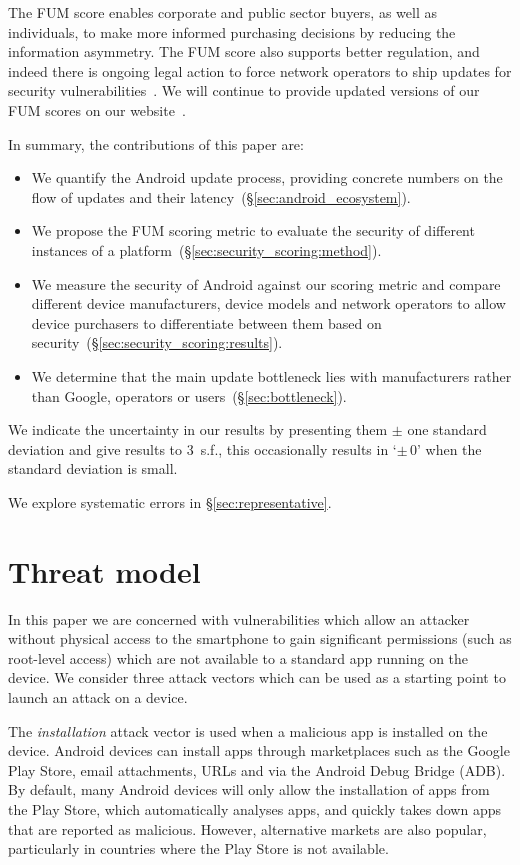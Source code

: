 \documentclass{sig-alternate-2013}
\let\OldTodo\todo
\renewcommand{\todo}{\OldTodo[inline]}
\newcommand{\todolater}[1]{}%
\begin{document}
The FUM score enables corporate and public sector buyers, as well as individuals, to make more informed purchasing decisions by reducing the information asymmetry.
The FUM score also supports better regulation, and indeed there is ongoing legal action to force network operators to ship updates for security vulnerabilities~\cite{Soghoian2013}.\todolater{Check on the status of this legal action}
We will continue to provide updated versions of our FUM scores on our website~\cite{androidvulnerabilities.org}.

In summary, the contributions of this paper are:
\begin{itemize}
 \item We quantify the Android update process, providing concrete numbers on the flow of updates and their latency~(\S\ref{sec:android_ecosystem}).
 \item We propose the FUM scoring metric to evaluate the security of different instances of a platform~(\S\ref{sec:security_scoring:method}).
 \item We measure the security of Android against our scoring metric and compare different device manufacturers, device models and network operators to allow device purchasers to differentiate between them based on security~(\S\ref{sec:security_scoring:results}).
 \item We determine that the main update bottleneck lies with manufacturers rather than Google, operators or users~(\S\ref{sec:bottleneck}).
\end{itemize}

We indicate the uncertainty in our results by presenting them $\pm$ one standard deviation and give results to 3~s.f., this occasionally results in `$\pm\, 0$' when the standard deviation is small.
\todolater{Do we want to use the 95 percentile instead}
We explore systematic errors in \S\ref{sec:representative}.

\section{Threat model}
\label{sec:threatmodel}

In this paper we are concerned with vulnerabilities which allow an attacker without physical access to the smartphone to gain significant permissions (such as root-level access) which are not available to a standard app running on the device. We consider three attack vectors which can be used as a starting point to launch an attack on a device.

The \emph{installation} attack vector is used when a malicious app is installed on the device.
Android devices can install apps through marketplaces such as the Google Play Store, email attachments, URLs and via the Android Debug Bridge (ADB).
By default, many Android devices will only allow the installation of apps from the Play Store, which automatically analyses apps, and quickly takes down apps that are reported as malicious.
However, alternative markets are also popular, particularly in countries where the Play Store is not available.
\end{document}
